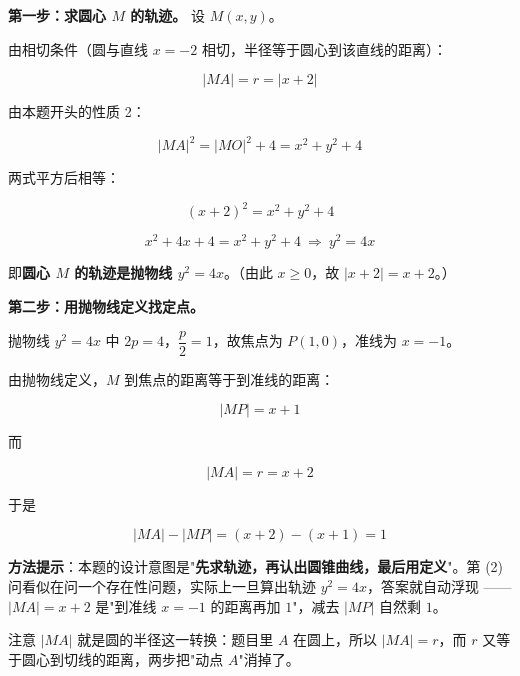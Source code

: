 \begin{answer}

\textbf{第一步：求圆心 $M$ 的轨迹。} 设 $M(x,y)$。

由相切条件（圆与直线 $x=-2$ 相切，半径等于圆心到该直线的距离）：

\nopagebreak[4]
\[|MA|=r=|x+2|\]

由本题开头的性质 2：

\nopagebreak[4]
\[|MA|^{2}=|MO|^{2}+4=x^{2}+y^{2}+4\]

两式平方后相等：

\nopagebreak[4]
\[(x+2)^{2}=x^{2}+y^{2}+4\]

\nopagebreak[4]
\[x^{2}+4x+4=x^{2}+y^{2}+4\ \Longrightarrow\ \boxed{y^{2}=4x}\]

即\textbf{圆心 $M$ 的轨迹是抛物线 $y^{2}=4x$}。（由此 $x\ge0$，故 $|x+2|=x+2$。）

\textbf{第二步：用抛物线定义找定点。}

抛物线 $y^{2}=4x$ 中 $2p=4$，$\dfrac p2=1$，故焦点为 $P(1,0)$，准线为 $x=-1$。

由抛物线定义，$M$ 到焦点的距离等于到准线的距离：

\nopagebreak[4]
\[|MP|=x+1\]

而

\nopagebreak[4]
\[|MA|=r=x+2\]

\Needspace{0.35\textheight}

于是

\nopagebreak[4]
\[|MA|-|MP|=(x+2)-(x+1)=1\]

\begin{gktip}
\textbf{方法提示}：本题的设计意图是"\textbf{先求轨迹，再认出圆锥曲线，最后用定义}"。第 (2) 问看似在问一个存在性问题，实际上一旦算出轨迹 $y^{2}=4x$，答案就自动浮现 —— $|MA|=x+2$ 是"到准线 $x=-1$ 的距离再加 $1$"，减去 $|MP|$ 自然剩 $1$。

注意 $|MA|$ 就是圆的半径这一转换：题目里 $A$ 在圆上，所以 $|MA|=r$，而 $r$ 又等于圆心到切线的距离，两步把"动点 $A$"消掉了。
\end{gktip}



\par\medskip

\end{answer}

